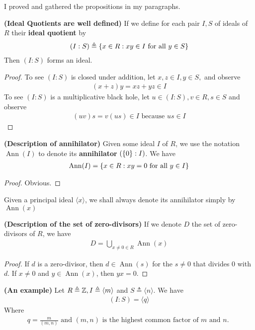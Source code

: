 \documentclass{report}
\begin{document}
I proved and gathered the propositions in my paragraphs. 
\begin{theorem}
\textbf{(Ideal Quotients are well defined)} If we define for each pair $I,S$ of ideals of $R$ their \textbf{ideal quotient} by
\begin{align*}
  (I:S)\triangleq \{ x\in R: xy \in I\text{ for all }y \in S  \}
\end{align*}
Then $(I:S)$ forms an ideal.  
\end{theorem}
\begin{proof}
To see $(I:S)$ is closed under addition, let $x,z \in I,y \in S,$ and observe 
\begin{align*}
  (x+z)y=xz+yz \in I
\end{align*}
To see $(I:S)$ is a multiplicative black hole, let $u \in (I:S),v \in R,s \in S$ and observe 
\begin{align*}
  (uv)s=v(us)\in I\text{ because }us \in I
\end{align*}
\end{proof}
\begin{theorem}
\textbf{(Description of annihilator)} Given some ideal $I$ of $R$, we use the notation $\operatorname{Ann}(I)$ to denote its \textbf{annihilator} $(\{ 0 \}:I)$. We have 
\begin{align*}
\operatorname{Ann}(I)=\{ x\in R: xy=0\text{ for all }y \in I \}
\end{align*}
\end{theorem}
\begin{proof}
Obvious.
\end{proof}
\begin{mdframed}
Given a principal ideal $\langle x\rangle $, we shall always denote its annihilator simply by $\operatorname{Ann}(x)$
\end{mdframed}
\begin{theorem}
\textbf{(Description of the set of zero-divisors)} If we denote  $D$ the set of zero-divisors of $R$, we have 
\begin{align*}
D = \bigcup_{x\neq 0 \in R} \operatorname{Ann}(x )
\end{align*}
\end{theorem}
\begin{proof}
If $d$ is a zero-divisor, then $d \in \operatorname{Ann}(s)$ for the $s\neq 0$ that divides $0$ with  $d$.  If $x\neq 0$ and $y \in \operatorname{Ann}(x)$, then $yx=0$.  
\end{proof}
\begin{theorem}
\textbf{(An example)} Let $R\triangleq \mathbb{Z},I\triangleq \langle m\rangle$ and $S\triangleq \langle n\rangle $. We have 
\begin{align*}
  (I:S)=\langle q\rangle 
\end{align*}
Where  
\begin{align*}
q= \frac{m}{(m,n)}\text{ and }(m,n)\text{ is the highest common factor of $m$ and $n$. }
\end{align*}
\end{theorem}
\end{document}
